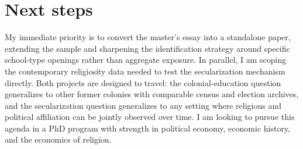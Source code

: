 \documentclass[letterpaper,11pt,leqno]{article}
\begin{document}
\section{Next steps}\label{s:next}

My immediate priority is to convert the master's essay into a standalone paper, extending the sample and sharpening the identification strategy around specific school-type openings rather than aggregate exposure. In parallel, I am scoping the contemporary religiosity data needed to test the secularization mechanism directly. Both projects are designed to travel: the colonial-education question generalizes to other former colonies with comparable census and election archives, and the secularization question generalizes to any setting where religious and political affiliation can be jointly observed over time. I am looking to pursue this agenda in a PhD program with strength in political economy, economic history, and the economics of religion.
\end{document}
